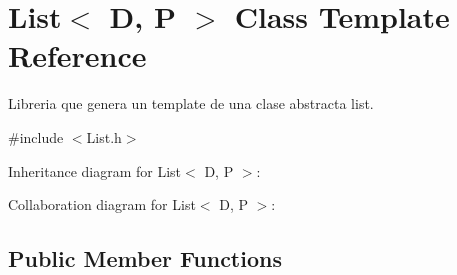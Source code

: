 \hypertarget{class_list}{\section{List$<$ D, P $>$ Class Template Reference}
\label{class_list}
}


Libreria que genera un template de una clase abstracta list.  




{\ttfamily \#include $<$List.\+h$>$}



Inheritance diagram for List$<$ D, P $>$\+:


Collaboration diagram for List$<$ D, P $>$\+:
\subsection*{Public Member Functions}
